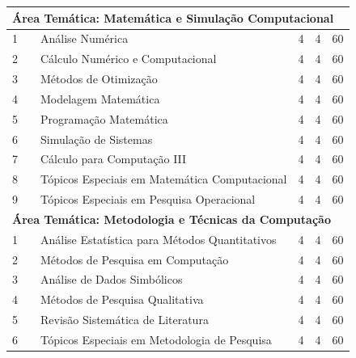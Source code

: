 \documentclass[
	12pt,				%
	openright,			%
  oneside,     %
	a4paper,			%
	chapter=TITLE,		%
	english,			%
	french,				%
	spanish,			%
	brazil				%
	]{abntex2}
\begin{document}
\begin{apendicesenv}
\begin{longtable}{r|r|l|r|r|r}
\multicolumn{6}{l}{\textbf{Área Temática: Matemática e Simulação Computacional}} \\ \hline
    1     &       & Análise Numérica & 4     & 4     & 60 \\ \hline
    2     &       & Cálculo Numérico e Computacional & 4     & 4     & 60 \\ \hline
    3     &       & Métodos de Otimização & 4     & 4     & 60 \\ \hline
    4     &       & Modelagem Matemática & 4     & 4     & 60 \\ \hline
    5     &       & Programação Matemática & 4   & 4  & 60 \\ \hline
    6     &       & Simulação de Sistemas & 4     & 4     & 60 \\ \hline
    7     &       & Cálculo para Computação III & 4     & 4     & 60 \\ \hline
    8     &       & \small{Tópicos Especiais em Matemática Computacional} & 4     & 4     & 60 \\ \hline
    9     &       & \small{Tópicos Especiais em Pesquisa Operacional} & 4     & 4     & 60 \\ \hline

\multicolumn{6}{l}{\textbf{Área Temática: Metodologia e Técnicas da Computação}} \\ \hline
    1     &       & \small{Análise Estatística para Métodos Quantitativos} & 4     & 4     & 60 \\ \hline
    2     &       & Métodos de Pesquisa em Computação & 4     & 4     & 60 \\ \hline
    3     &       & Análise de Dados Simbólicos & 4     & 4     & 60 \\ \hline
    4     &       & Métodos de Pesquisa Qualitativa & 4     & 4     & 60 \\ \hline
    5     &       & Revisão Sistemática de Literatura & 4     & 4     & 60 \\ \hline
    6     &       & \small{Tópicos Especiais em Metodologia de Pesquisa} & 4     & 4     & 60 \\ \hline


\end{longtable}
\end{apendicesenv}
\end{document}
